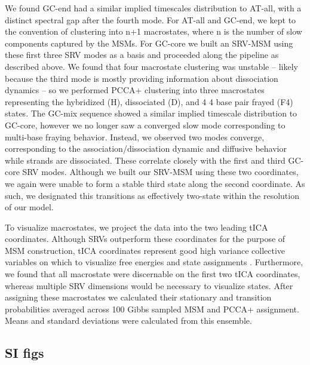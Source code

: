\documentclass[journal=jpcbfk,manuscript=article]{achemso}
\begin{document}
We found GC-end had a similar implied timescales distribution to AT-all, with a distinct spectral gap after the fourth mode. For AT-all and GC-end, we kept to the convention of clustering into n+1 macrostates, where n is the number of slow components captured by the MSMs. For GC-core we built an SRV-MSM using these first three SRV modes as a basis and proceeded along the pipeline as described above. We found that four macrostate clustering was unstable -- likely because the third mode is mostly providing  information about dissociation dynamics -- so we performed PCCA+ clustering into three macrostates representing the hybridized (H), dissociated (D), and 4 4 base pair frayed (F4) states.  The GC-mix sequence showed a similar implied timescale distribution to GC-core, however we no longer saw a converged slow mode corresponding to multi-base fraying behavior. Instead, we observed two modes converge, corresponding to the association/dissociation dynamic and diffusive behavior while strands are dissociated. These correlate closely with the first and third GC-core SRV modes. Although we built our SRV-MSM using these two coordinates, we again were unable to form a stable third state along the second coordinate. As such, we designated this transitions as effectively two-state within the resolution of our model.


To visualize macrostates, we project the data into the two leading tICA coordinates. Although SRVs outperform these coordinates for the purpose of MSM construction, tICA coordinates represent good high variance collective variables on which to visualize free energies and state assignments \citep{Sidky}. Furthermore, we found that all macrostate were discernable on the first two tICA coordinates, whereas multiple SRV dimensions would be necessary to visualize states. After assigning these macrostates we calculated their stationary and transition probabilities averaged across 100 Gibbs sampled MSM and PCCA+ assignment. Means and standard deviations were calculated from this ensemble.


\subsection{\label{sec:Results}SI figs}
\end{document}
